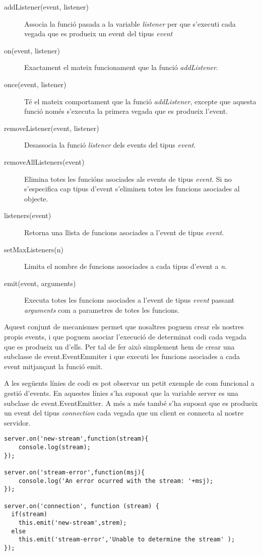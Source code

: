 \begin{description}
    \item[addListener(event, listener)]{ Associa la funció pasada a la variable \emph{listener} per que s'executi cada vegada que es produeix un event del tipus \emph{event}}
    \item[on(event, listener)] { Exactament el mateix funcionament que la funció \emph{addListener}.}
    \item[once(event, listener)] {Té el mateix comportament que la funció \emph{addListener}, excepte que aquesta funció només s'executa la primera vegada que es produeix l'event.}
    \item[removeListener(event, listener)]{ Desassocia la funció \emph{listener} dels events del tipus \emph{event}.}
    \item[removeAllListeners(event)] {Elimina totes les funcións asociades als events de tipus \emph{event}. Si no s'especifica cap tipus d'event s'eliminen totes les funcions asociades al objecte.}
    \item[listeners(event)] { Retorna una llista de funcions asociades a l'event de tipus \emph{event}.}
    \item[setMaxListeners(n)] {Limita el nombre de funcions associades a cada tipus d'event a \emph{n}.}
    \item[emit(event, arguments)] { Executa totes les funcions asociades a l'event de tipus \emph{event} passant \emph{arguments} com a parametres de totes les funcions.}
\end{description}

Aquest conjunt de mecanismes permet que nosaltres poguem crear els nostres propis events, i que poguem asociar l'execució de determinat codi cada vegada que es produeix un d'ells. Per tal de fer això simplement hem de crear una subclasse de event.EventEmmiter i que executi les funcions asociades a cada event mitjançant la funció emit. 

A les següents línies de codi es pot observar un petit exemple de com funcional a gestió d'events. En aquestes línies s'ha suposat que la variable server es una subclase de event.EventEmitter. A més a més també s'ha suposat que es produeix un event del tipus \emph{connection} cada vegada que un client es connecta al nostre servidor. 

\begin{lstlisting}
server.on('new-stream',function(stream){
    console.log(stream);
});

server.on('stream-error',function(msj){
    console.log('An error ocurred with the stream: '+msj);
});

server.on('connection', function (stream) {
  if(stream) 
    this.emit('new-stream',strem);
  else
    this.emit('stream-error','Unable to determine the stream' );
});
\end{lstlisting}

